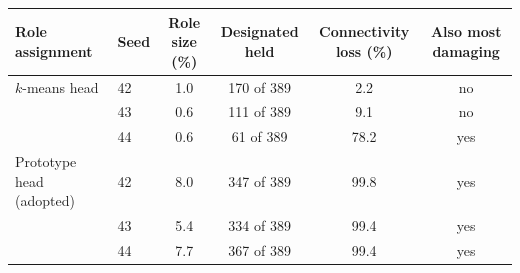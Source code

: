 \small
\caption{\textbf{Reproducibility of the role-level result across training seeds.} For each independently trained model of the primary network we take the role with the highest density of designated addresses and report its size, how many of the 389 designated addresses it holds, and the connectivity lost when it is removed. Under the $k$-means head the answer depends on the seed: the role holds between 16\% and 44\% of the designated addresses and its removal costs between 2\% and 78\% of connectivity, and in two of three seeds it is not the role whose removal costs most. Under the prototype head the same role holds 86--94\% of the designated addresses, its removal costs 99.4--99.8\%, and it is the most damaging role in every seed. Agreement between partitions is lower for the prototype head (Supplementary Table~\ref{tab:model-variants}), but the conclusion drawn from them is what has to be reproducible, and it is.}
\label{tab:role-reproducibility}
\begin{tabular}{llcccc}
\toprule
Role assignment & Seed & Role size (\%) & Designated held & Connectivity loss (\%) & Also most damaging \\
\midrule
$k$-means head & 42 & 1.0 & 170 of 389 & 2.2 & no \\
 & 43 & 0.6 & 111 of 389 & 9.1 & no \\
 & 44 & 0.6 & 61 of 389 & 78.2 & yes \\
\midrule
Prototype head (adopted) & 42 & 8.0 & 347 of 389 & 99.8 & yes \\
 & 43 & 5.4 & 334 of 389 & 99.4 & yes \\
 & 44 & 7.7 & 367 of 389 & 99.4 & yes \\
\bottomrule
\end{tabular}
